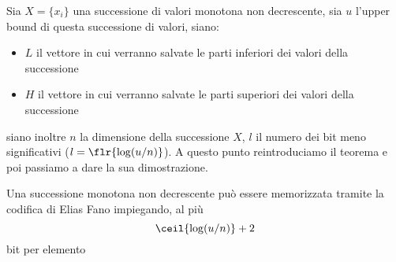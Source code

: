 Sia $X=\{x_i\}$ una successione di valori monotona non decrescente, sia $u$ l'upper bound di questa successione di valori, siano:
\begin{itemize}
    \item $L$ il vettore in cui verranno salvate le parti inferiori dei valori della successione
    \item $H$ il vettore in cui verranno salvate le parti superiori dei valori della successione
\end{itemize}
siano inoltre $n$ la dimensione della successione $X$, $l$ il numero dei bit meno significativi ($l = \flr{\log(u/n)}$). A questo punto reintroduciamo il teorema e poi passiamo a dare la sua dimostrazione.
\begin{theorem}
    Una successione monotona non decrescente può essere memorizzata tramite la codifica di Elias Fano impiegando, al più
    \begin{equation}
        \ceil{\log(u/n)} + 2
    \end{equation}
    bit per elemento
\end{theorem}
